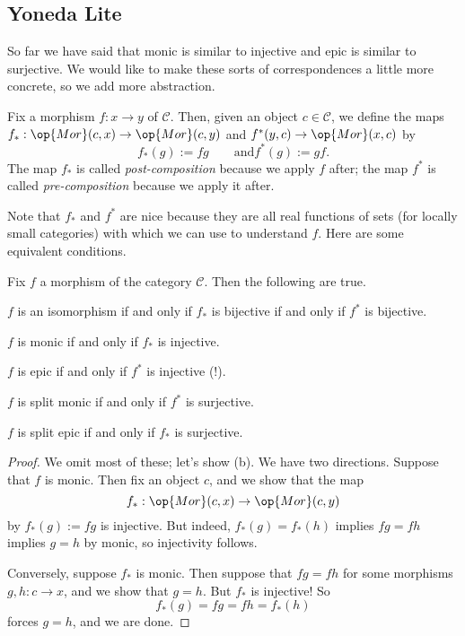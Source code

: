 \documentclass[../notes.tex]{subfiles}
\begin{document}
\subsection{Yoneda Lite}
So far we have said that monic is similar to injective and epic is similar to surjective. We would like to make these sorts of correspondences a little more concrete, so we add more abstraction.
\begin{definition}
	Fix a morphism $f:x\to y$ of $\mathcal C$. Then, given an object $c\in\mathcal C$, we define the maps $f_*:\op{Mor}(c,x)\to\op{Mor}(c,y)$ and $f^*(y,c)\to\op{Mor}(x,c)$ by
	\[f_*(g):=fg\qquad\text{and}f^*(g):=gf.\]
	The map $f_*$ is called \textit{post-composition} because we apply $f$ after; the map $f^*$ is called \textit{pre-composition} because we apply it after.
\end{definition}


Note that $f_*$ and $f^*$ are nice because they are all real functions of sets (for locally small categories) with which we can use to understand $f$. Here are some equivalent conditions.
\begin{proposition}
	Fix $f$ a morphism of the category $\mathcal C$. Then the following are true.
	\begin{listalph}
		\item $f$ is an isomorphism if and only if $f_*$ is bijective if and only if $f^*$ is bijective.
		\item $f$ is monic if and only if $f_*$ is injective.
		\item $f$ is epic if and only if $f^*$ is injective (!).
		\item $f$ is split monic if and only if $f^*$ is surjective.
		\item $f$ is split epic if and only if $f_*$ is surjective.
	\end{listalph}
\end{proposition}
\begin{proof}
	We omit most of these; let's show (b). We have two directions. Suppose that $f$ is monic. Then fix an object $c$, and we show that the map
	\[f_*:\op{Mor}(c,x)\to\op{Mor}(c,y)\]
	by $f_*(g):=fg$ is injective. But indeed, $f_*(g)=f_*(h)$ implies $fg=fh$ implies $g=h$ by monic, so injectivity follows.

	Conversely, suppose $f_*$ is monic. Then suppose that $fg=fh$ for some morphisms $g,h:c\to x$, and we show that $g=h$. But $f_*$ is injective! So
	\[f_*(g)=fg=fh=f_*(h)\]
	forces $g=h$, and we are done.
\end{proof}
\end{document}
